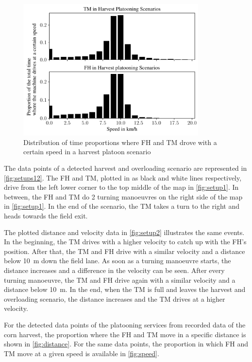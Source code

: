 \begin{figure}%
	\centering
	\includegraphics[width=0.85\textwidth]{figures/speedHarvestScenario.pdf}
	\caption{Distribution of time proportions where \acf{FH} and \acf{TM} drove with a certain speed in a harvest platoon scenario}%
	\label{fig:speed}%
\end{figure}

The data points of a detected harvest and overloading scenario are represented in \autoref{fig:setups12}.
The \ac{FH} and \ac{TM}, plotted in as black and white lines respectively, drive from the left lower corner to the top middle of the map in \autoref{fig:setup1}.
In between, the \ac{FH} and \ac{TM} do \num{2} turning manoeuvres on the right side of the map in \autoref{fig:setup1}.
In the end of the scenario, the \ac{TM} takes a turn to the right and heads towards the field exit.

The plotted distance and velocity data in \autoref{fig:setup2} illustrates the same events.
In the beginning, the \ac{TM} drives with a higher velocity to catch up with the \ac{FH}'s position.
After that, the \ac{TM} and \ac{FH} drive with a similar velocity and a distance below \SI{10}{\metre} down the field lane.
As soon as a turning manoeuvre starts, the distance increases and a difference in the velocity can be seen.
After every turning manoeuvre, the \ac{TM} and \ac{FH} drive again with a similar velocity and a distance below \SI{10}{\metre}.
In the end, when the \ac{TM} is full and leaves the harvest and overloading scenario, the distance increases and the \ac{TM} drives at a higher velocity.

For the detected data points of the platooning services from recorded data of the corn harvest,
the proportion where the \ac{FH} and \ac{TM} move in a specific distance is shown in \autoref{fig:distance}.
For the same data points, the proportion in which \ac{FH} and \ac{TM} move at a given speed is available in \autoref{fig:speed}.

